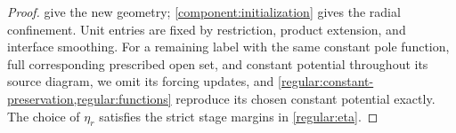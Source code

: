 \begin{proof}
 give the
new geometry; \cref{component:initialization} gives the radial confinement.
Unit entries are fixed by restriction, product extension, and interface
smoothing. For a remaining label with the same constant pole function, full
corresponding prescribed open set, and constant potential throughout its
source diagram,
we omit its forcing updates, and
\cref{regular:constant-preservation,regular:functions} reproduce its chosen
constant potential exactly. The choice of $\eta_r$ satisfies the strict
stage margins in \eqref{regular:eta}.
\end{proof}
